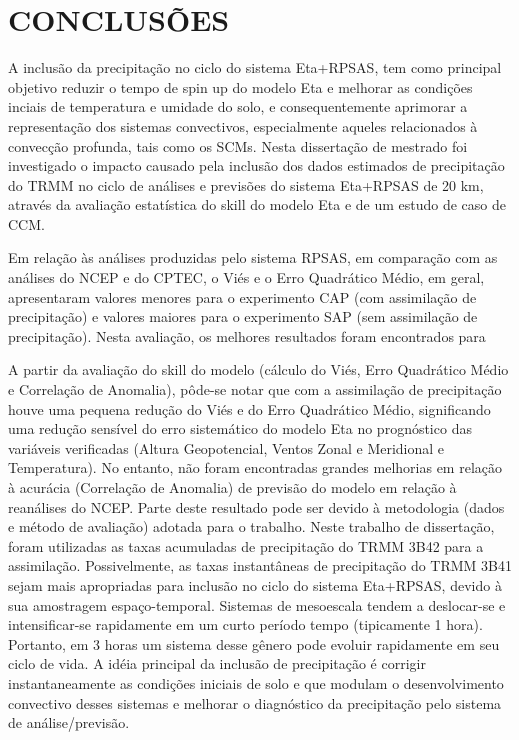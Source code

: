 \hypertarget{estilo:capitulo}{}
\chapter{CONCLUSÕES}
\label{ss:cap5}

A inclusão da precipitação no ciclo do sistema Eta+RPSAS, tem como principal objetivo reduzir o tempo de spin up do modelo Eta e melhorar as condições inciais de temperatura e umidade do solo, e consequentemente aprimorar a representação dos sistemas convectivos, especialmente aqueles relacionados à convecção profunda, tais como os SCMs. Nesta dissertação de mestrado foi investigado o impacto causado pela inclusão dos dados estimados de precipitação do TRMM no ciclo de análises e previsões do sistema Eta+RPSAS de 20 km, através da avaliação estatística do skill do modelo Eta e de um estudo de caso de CCM.

Em relação às análises produzidas pelo sistema RPSAS, em comparação com as análises do NCEP e do CPTEC, o Viés e o Erro Quadrático Médio, em geral,  apresentaram valores menores para o experimento CAP (com assimilação de precipitação) e valores maiores para o experimento SAP (sem assimilação de precipitação). Nesta avaliação, os melhores resultados foram encontrados para 

A partir da avaliação do skill do modelo (cálculo do Viés, Erro Quadrático Médio e Correlação de Anomalia), pôde-se notar que com a assimilação de precipitação houve uma pequena redução do Viés e do Erro Quadrático Médio, significando uma redução sensível do erro sistemático do modelo Eta no prognóstico das variáveis verificadas (Altura Geopotencial, Ventos Zonal e Meridional e Temperatura). No entanto, não foram encontradas grandes melhorias em relação à acurácia (Correlação de Anomalia) de previsão do modelo em relação à reanálises do NCEP. Parte deste resultado pode ser devido à metodologia (dados e método de avaliação) adotada para o trabalho. Neste trabalho de dissertação, foram utilizadas as taxas acumuladas de precipitação do TRMM 3B42 para a assimilação. Possivelmente, as taxas instantâneas de precipitação do TRMM 3B41 sejam mais apropriadas para inclusão no ciclo do sistema Eta+RPSAS, devido à sua amostragem espaço-temporal. Sistemas de mesoescala tendem a deslocar-se e intensificar-se rapidamente em um curto período tempo (tipicamente 1 hora). Portanto, em 3 horas um sistema desse gênero pode evoluir rapidamente em seu ciclo de vida. A idéia principal da inclusão de precipitação é corrigir instantaneamente as condições iniciais de solo e que modulam o desenvolvimento convectivo desses sistemas e melhorar o diagnóstico da precipitação pelo sistema de análise/previsão.

